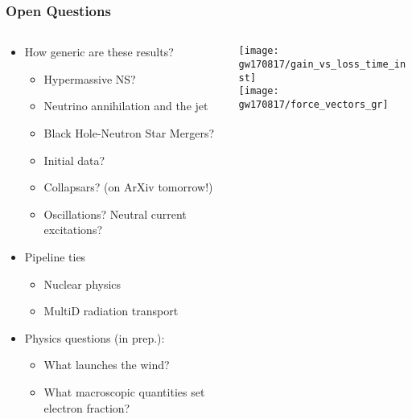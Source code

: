 \documentclass[]{beamer}
\begin{document}
\begin{frame}
  \frametitle{Open Questions}
  \begin{columns}
    \begin{column}{7cm}
      \begin{itemize}
      \item How generic are these results?
        \begin{itemize}
        \item Hypermassive NS?
        \item Neutrino annihilation and the jet
        \item Black Hole-Neutron Star Mergers?
        \item Initial data?
        \item Collapsars? (on ArXiv tomorrow!)
        \item Oscillations? Neutral current excitations?
        \end{itemize}
      \item Pipeline ties
        \begin{itemize}
        \item Nuclear physics
        \item MultiD radiation transport
        \end{itemize}
      \item Physics questions (in prep.):
        \begin{itemize}
        \item What launches the wind?
        \item What macroscopic quantities set electron fraction?
        \end{itemize}
      \end{itemize}
    \end{column}
    \begin{column}{5cm}
      \begin{center}
        \texttt{[image: gw170817/gain\_vs\_loss\_time\_inst]}\\
        \texttt{[image: gw170817/force\_vectors\_gr]}
      \end{center}
    \end{column}
  \end{columns}
\end{frame}
\end{document}

